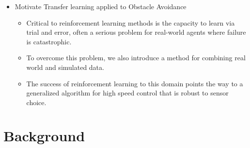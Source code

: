 \documentclass[paper=a4, fontsize=11pt]{scrartcl} %
\begin{document}
\begin{itemize}
	\item Motivate Transfer learning applied to Obstacle Avoidance
	\begin{itemize}
		\item Critical to reinforcement learning methods is the capacity to learn via trial and error, often a serious problem for real-world agents where failure is catastrophic.
		\item To overcome this problem, we also introduce a method for combining real world and simulated data.
		\item The success of reinforcement learning to this domain points the way to a generalized algorithm for high speed control that is robust to sensor choice.
	\end{itemize}
\end{itemize}

\section{Background}
\end{document}
